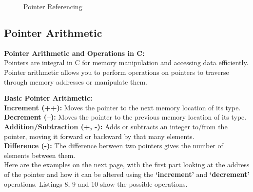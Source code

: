 \documentclass[a4paper,12pt]{article}
\begin{document}
\begin{figure}[H]
    \centering
    \caption{Pointer Referencing}
    \label{fig:enter-label}
\end{figure}

\subsection{Pointer Arithmetic}

\textbf{Pointer Arithmetic and Operations in C:}\\
Pointers are integral in C for memory manipulation and accessing data efficiently. Pointer arithmetic allows you to perform operations on pointers to traverse through memory addresses or manipulate them.

\textbf{Basic Pointer Arithmetic:}\\
\textbf{Increment (++):} Moves the pointer to the next memory location of its type.\\
\textbf{Decrement (--):} Moves the pointer to the previous memory location of its type.\\
\textbf{Addition/Subtraction (+, -):} Adds or subtracts an integer to/from the pointer, moving it forward or backward by that many elements.\\
\textbf{Difference (-):} The difference between two pointers gives the number of elements between them.\\ 

Here are the examples on the next page, with the first part looking at the address of the pointer and how it can be altered using the \textbf{`increment'} and \textbf{`decrement'} operations. Listings 8, 9 and 10 show the possible operations. 
\end{document}
